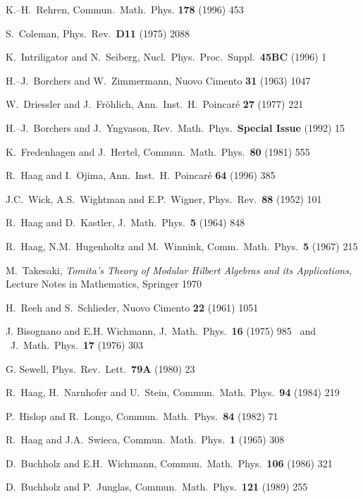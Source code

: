 \begin{thebibliography}{99}
 K.--H.\ Rehren,
Commun.\ Math.\ Phys. {\bf 178} (1996) 453 

 S.\ Coleman, 
Phys.\ Rev.\ {\bf D11} (1975) 2088

K.\ Intriligator and N.\ Seiberg, 
Nucl.\ Phys.\ Proc.\ Suppl.\ {\bf 45BC} (1996) 1 

 H.--J.\ Borchers and W.\ Zimmermann,
Nuovo Cimento {\bf 31} (1963) 1047

W.\ Driessler and J.\ Fr\"ohlich, 
Ann.\ Inst.\ H.\ Poincar\'e {\bf 27} (1977) 221

H.--J.\ Borchers and J.\ Yngvason,
Rev.\ Math.\ Phys.\ {\bf Special Issue} (1992) 15

K.\ Fredenhagen and J.\ Hertel,
Commun.\ Math.\ Phys.\ {\bf 80} (1981) 555

R.\ Haag and I.\ Ojima,
Ann.\ Inst.\ H.\ Poincar\'e {\bf 64} (1996) 385

 J.C.\ Wick, A.S.\ Wightman and E.P.\ Wigner, 
Phys.\ Rev.\ {\bf 88} (1952) 101

 R.\ Haag and D.\ Kastler, J.\ Math.\ Phys.\ {\bf 5}
(1964) 848

 R.\ Haag, N.M.\ Hugenholtz and M.\ Winnink, 
Comm.\ Math.\ Phys.\  {\bf 5} (1967) 215

 M.\ Takesaki, {\it Tomita's Theory of Modular
Hilbert Algebras and its Applications}, Lecture Notes in Mathematics, 
Springer 1970 

 H.\ Reeh and S.\ Schlieder, Nuovo Cimento {\bf 22}
(1961) 1051 

 J. Bisognano and E.H. Wichmann, 
J.\ Math.\ Phys.\ {\bf 16} (1975) 985 \ and \ 
J.\ Math.\ Phys.\ {\bf 17} (1976) 303

 G. Sewell, 
Phys.\ Rev.\ Lett.\ {\bf 79A} (1980) 23

 R.\ Haag, H.\ Narnhofer and U.\ Stein, 
Commun.\ Math.\ Phys.\ {\bf 94} (1984) 219  

 P.\ Hislop and R.\ Longo, Commun.\ Math.\ Phys.\
{\bf 84} (1982) 71

 R.\ Haag and J.A.\ Swieca, 
Commun.\ Math.\ Phys.\ {\bf 1} (1965) 308

D.\ Buchholz and E.H.\ Wichmann, 
Commun.\ Math.\ Phys.\ {\bf 106} (1986) 321

 D.\ Buchholz and P.\ Junglas, 
Commun.\ Math.\ Phys.\ {\bf 121} (1989) 255


\end{thebibliography}
